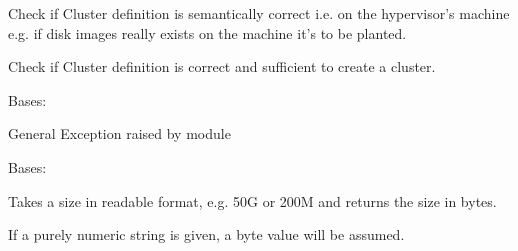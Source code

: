 \documentclass[letterpaper,10pt,english]{sphinxmanual}
\begin{document}
\begin{fulllineitems}

\begin{fulllineitems}
\label{ref-manual/XrdTest:XrdTest.ClusterUtils.Cluster.validateDynamic}
Check if Cluster definition is semantically correct i.e. on the
hypervisor's machine e.g. if disk images really exists on
the machine it's to be planted.

\end{fulllineitems}


\begin{fulllineitems}
\label{ref-manual/XrdTest:XrdTest.ClusterUtils.Cluster.validateStatic}
Check if Cluster definition is correct and sufficient
to create a cluster.

\end{fulllineitems}


\end{fulllineitems}


\begin{fulllineitems}
\label{ref-manual/XrdTest:XrdTest.ClusterUtils.ClusterManagerException}
Bases: 

General Exception raised by module

\end{fulllineitems}


\begin{fulllineitems}
\label{ref-manual/XrdTest:XrdTest.ClusterUtils.Disk}
Bases: 

\begin{fulllineitems}
\label{ref-manual/XrdTest:XrdTest.ClusterUtils.Disk.parseDiskSize}
Takes a size in readable format, e.g. 50G or 200M and returns the size in bytes.

If a purely numeric string is given, a byte value will be assumed.

\end{fulllineitems}


\end{fulllineitems}
\end{document}
